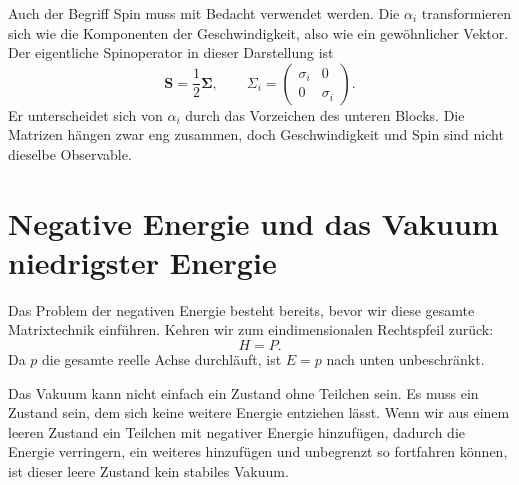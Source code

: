 \begin{classroomqa}
\end{classroomqa}

\begin{classroomqa}
\end{classroomqa}

Auch der Begriff Spin muss mit Bedacht verwendet werden. Die \(\alpha_i\) transformieren sich wie die Komponenten der Geschwindigkeit, also wie ein gewöhnlicher Vektor. Der eigentliche Spinoperator in dieser Darstellung ist
\begin{equation}
\mathbf S=\frac12\boldsymbol{\Sigma},
\qquad
\Sigma_i=
\begin{pmatrix}
\sigma_i&0\\
0&\sigma_i
\end{pmatrix}.
\label{eq:l10-spin-operator}
\end{equation}
Er unterscheidet sich von \(\alpha_i\) durch das Vorzeichen des unteren Blocks. Die Matrizen hängen zwar eng zusammen, doch Geschwindigkeit und Spin sind nicht dieselbe Observable.

\section{Negative Energie und das Vakuum niedrigster Energie}

Das Problem der negativen Energie besteht bereits, bevor wir diese gesamte Matrixtechnik einführen. Kehren wir zum eindimensionalen Rechtspfeil zurück:
\begin{equation}
H=P.
\end{equation}
Da \(p\) die gesamte reelle Achse durchläuft, ist \(E=p\) nach unten unbeschränkt.

Das Vakuum kann nicht einfach ein Zustand ohne Teilchen sein. Es muss ein Zustand sein, dem sich keine weitere Energie entziehen lässt. Wenn wir aus einem leeren Zustand ein Teilchen mit negativer Energie hinzufügen, dadurch die Energie verringern, ein weiteres hinzufügen und unbegrenzt so fortfahren können, ist dieser leere Zustand kein stabiles Vakuum.

